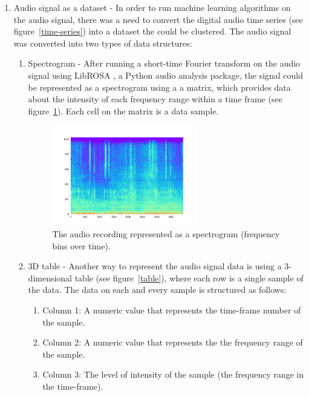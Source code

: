 \documentclass[10pt,twocolumn]{article}
\begin{document}
\begin{enumerate}
  \item Audio signal as a dataset - In order to run machine learning algorithms on the audio signal, there was a need to convert the digital audio time series (see figure~\ref{time-series}) into a dataset the could be clustered. The audio signal was converted into two types of data structures:
  \begin{enumerate}
      \item Spectrogram - After running a short-time Fourier transform on the audio signal using LibROSA \cite{ref1}, a Python audio analysis package, the signal could be represented as a spectrogram using a a matrix, which provides data about the intensity of each frequency range within a time frame (see figure~\ref{spectrogram}). Each cell on the matrix is a data sample.

      \begin{figure}[!h]
        \begin{center}
          \includegraphics[width=2.5in]{images/02.png}
        \end{center}

        \caption{The audio recording represented as a spectrogram (frequency bins over time).}
        \label{spectrogram}
      \end{figure}

      \item 3D table - Another way to represent the audio signal data is using a 3-dimensional table (see figure~\ref{table}), where each row is a single sample of the data. The data on each and every sample is structured as follows:
      \begin{enumerate}
      \item Column 1: A numeric value that represents the time-frame number of the sample.
      \item Column 2: A numeric value that represents the the frequency range of the sample.
      \item Column 3: The level of intensity of the sample (the frequency range in the time-frame).


\end{enumerate}
\end{enumerate}
\end{enumerate}
\end{document}

